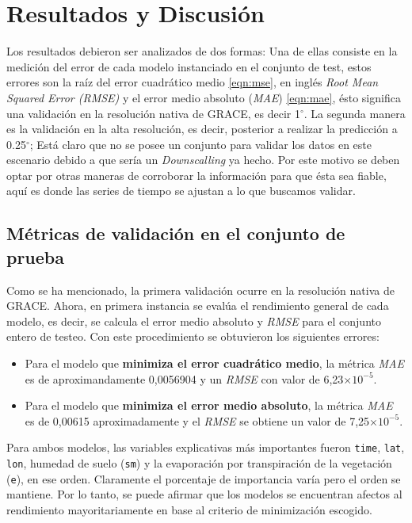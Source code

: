 \chapter{Resultados y Discusión}
\label{C4}
Los resultados debieron ser analizados de dos formas: Una de ellas consiste en la medición del error de cada modelo instanciado en el conjunto de test, estos errores son la 
raíz del error cuadrático medio \ref{eqn:mse}, en inglés \textit{Root Mean Squared Error (RMSE)} y el error medio absoluto (\textit{MAE}) \ref{eqn:mae}, ésto significa una validación en la resolución nativa de 
GRACE, es decir 1$^\circ$. La segunda manera es la validación en la alta resolución, es decir, posterior a realizar la predicción a 0.25$^\circ$; Está claro que no se posee
un conjunto para validar los datos en este escenario debido a que sería un \textit{Downscalling} ya hecho. Por este motivo se deben optar por otras maneras de corroborar la información
para que ésta sea fiable, aquí es donde las series de tiempo se ajustan a lo que buscamos validar.

\section{Métricas de validación en el conjunto de prueba }
Como se ha mencionado, la primera validación ocurre en la resolución nativa de GRACE. Ahora, en primera instancia se evalúa el rendimiento general de cada modelo, es decir, 
se calcula el error medio absoluto y \textit{RMSE} para el conjunto entero de testeo. Con este procedimiento se obtuvieron los siguientes errores:

\begin{itemize}
    \item Para el modelo que \textbf{minimiza el error cuadrático medio}, la métrica \textit{MAE} es de aproximandamente 0,0056904 y un \textit{RMSE} con valor de 6,23$ \times 10^{-5}$.
    \item Para el modelo que \textbf{minimiza el error medio absoluto}, la métrica \textit{MAE} es de 0,00615 aproximadamente y el \textit{RMSE} se obtiene un valor de 7,25$ \times 10^{-5}$.
\end{itemize}

Para ambos modelos, las variables explicativas más importantes fueron \texttt{time}, \texttt{lat}, \texttt{lon}, humedad de suelo (\texttt{sm}) y la evaporación por transpiración de la vegetación (\texttt{e}), en ese orden. Claramente el porcentaje de importancia
varía pero el orden se mantiene. Por lo tanto, se puede afirmar que los modelos se encuentran afectos al rendimiento mayoritariamente en base al criterio de minimización escogido.

